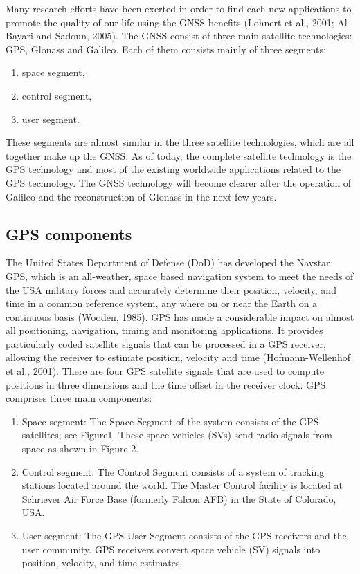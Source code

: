 Many research efforts have been exerted in order to find each new applications to promote the
quality of our life using the GNSS benefits (Lohnert et al., 2001; Al-Bayari and Sadoun, 2005).
The GNSS consist of three main satellite technologies: GPS, Glonass and Galileo. Each of them
consists mainly of three segments: 
\begin{enumerate}
	\item space segment,
	\item control segment,
	\item user segment.
\end{enumerate}
These segments are almost similar in the three satellite technologies, which are all together make
up the GNSS. As of today, the complete satellite technology is the GPS technology and most of
the existing worldwide applications related to the GPS technology. The GNSS technology will
become clearer after the operation of Galileo and the reconstruction of Glonass in the next few
years.

\subsection{GPS components}
The United States Department of Defense (DoD) has developed the Navstar GPS, which is an
all-weather, space based navigation system to meet the needs of the USA military forces and
accurately determine their position, velocity, and time in a common reference system, any where
on or near the Earth on a continuous basis (Wooden, 1985).
GPS has made a considerable impact on almost all positioning, navigation, timing and
monitoring applications. It provides particularly coded satellite signals that can be processed in a
GPS receiver, allowing the receiver to estimate position, velocity and time (Hofmann-Wellenhof
et al., 2001). There are four GPS satellite signals that are used to compute positions in three
dimensions and the time offset in the receiver clock. GPS comprises three main components:
\begin{enumerate}
	\item Space segment: The Space Segment of the system consists of the GPS satellites;
	 see Figure1. These space vehicles (SVs) send radio signals from space as shown in Figure 2.

	\item Control segment: The Control Segment consists of a system of tracking stations located
	around the world. The Master Control facility is located at Schriever Air Force Base
	(formerly Falcon AFB) in the State of Colorado, USA.

	\item User segment: The GPS User Segment consists of the GPS receivers and the user
	community. GPS receivers convert space vehicle (SV) signals into position, velocity, and
	time estimates.
\end{enumerate}

